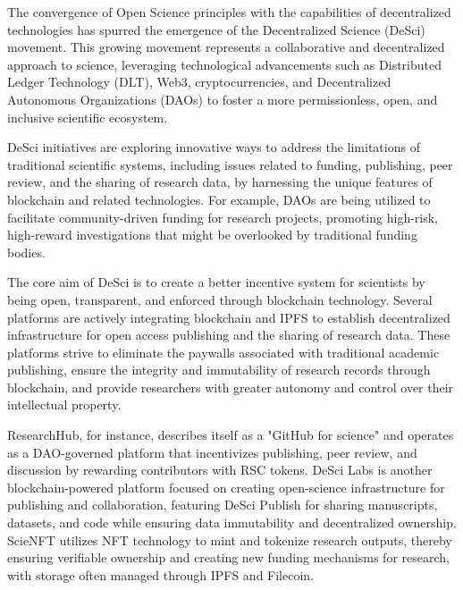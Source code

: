 \documentclass{article}
\begin{document}
The convergence of Open Science principles with the capabilities of decentralized technologies has spurred the emergence of the Decentralized Science (DeSci) movement. This growing movement represents a collaborative and decentralized approach to science, leveraging technological advancements such as Distributed Ledger Technology (DLT), Web3, cryptocurrencies, and Decentralized Autonomous Organizations (DAOs) to foster a more permissionless, open, and inclusive scientific ecosystem.

DeSci initiatives are exploring innovative ways to address the limitations of traditional scientific systems, including issues related to funding, publishing, peer review, and the sharing of research data, by harnessing the unique features of blockchain and related technologies. For example, DAOs are being utilized to facilitate community-driven funding for research projects, promoting high-risk, high-reward investigations that might be overlooked by traditional funding bodies.

The core aim of DeSci is to create a better incentive system for scientists by being open, transparent, and enforced through blockchain technology. Several platforms are actively integrating blockchain and IPFS to establish decentralized infrastructure for open access publishing and the sharing of research data. These platforms strive to eliminate the paywalls associated with traditional academic publishing, ensure the integrity and immutability of research records through blockchain, and provide researchers with greater autonomy and control over their intellectual property.

ResearchHub, for instance, describes itself as a "GitHub for science" and operates as a DAO-governed platform that incentivizes publishing, peer review, and discussion by rewarding contributors with RSC tokens. DeSci Labs is another blockchain-powered platform focused on creating open-science infrastructure for publishing and collaboration, featuring DeSci Publish for sharing manuscripts, datasets, and code while ensuring data immutability and decentralized ownership. ScieNFT utilizes NFT technology to mint and tokenize research outputs, thereby ensuring verifiable ownership and creating new funding mechanisms for research, with storage often managed through IPFS and Filecoin.
\end{document}

